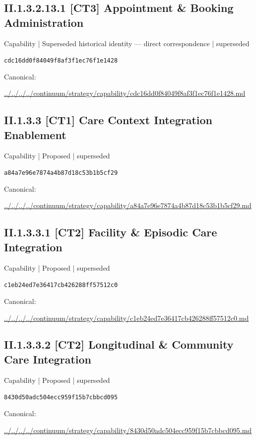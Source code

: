 \documentclass[10pt,a4paper]{article}
\begin{document}
\subsection*{II.1.3.2.13.1 [CT3] Appointment \& Booking Administration}
{\small Capability | Superseded historical identity — direct correspondence | superseded}\par
\texttt{cdc16dd0f84049f8af3f1ec76f1e1428}\par
Canonical: \par
{\footnotesize\url{../../../../continuum/strategy/capability/cdc16dd0f84049f8af3f1ec76f1e1428.md}}\par
\subsection*{II.1.3.3 [CT1] Care Context Integration Enablement}
{\small Capability | Proposed | superseded}\par
\texttt{a84a7e96e7874a4b87d18c53b1b5cf29}\par
Canonical: \par
{\footnotesize\url{../../../../continuum/strategy/capability/a84a7e96e7874a4b87d18c53b1b5cf29.md}}\par
\subsection*{II.1.3.3.1 [CT2] Facility \& Episodic Care Integration}
{\small Capability | Proposed | superseded}\par
\texttt{c1eb24ed7e36417cb426288ff57512c0}\par
Canonical: \par
{\footnotesize\url{../../../../continuum/strategy/capability/c1eb24ed7e36417cb426288ff57512c0.md}}\par
\subsection*{II.1.3.3.2 [CT2] Longitudinal \& Community Care Integration}
{\small Capability | Proposed | superseded}\par
\texttt{8430d50adc504ecc959f15b7cbbcd095}\par
Canonical: \par
{\footnotesize\url{../../../../continuum/strategy/capability/8430d50adc504ecc959f15b7cbbcd095.md}}\par
\end{document}
